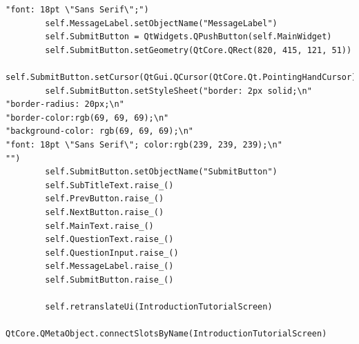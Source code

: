 \documentclass{article}
\begin{document}
\begin{lstlisting}
"font: 18pt \"Sans Serif\";")
        self.MessageLabel.setObjectName("MessageLabel")
        self.SubmitButton = QtWidgets.QPushButton(self.MainWidget)
        self.SubmitButton.setGeometry(QtCore.QRect(820, 415, 121, 51))
        self.SubmitButton.setCursor(QtGui.QCursor(QtCore.Qt.PointingHandCursor))
        self.SubmitButton.setStyleSheet("border: 2px solid;\n"
"border-radius: 20px;\n"
"border-color:rgb(69, 69, 69);\n"
"background-color: rgb(69, 69, 69);\n"
"font: 18pt \"Sans Serif\"; color:rgb(239, 239, 239);\n"
"")
        self.SubmitButton.setObjectName("SubmitButton")
        self.SubTitleText.raise_()
        self.PrevButton.raise_()
        self.NextButton.raise_()
        self.MainText.raise_()
        self.QuestionText.raise_()
        self.QuestionInput.raise_()
        self.MessageLabel.raise_()
        self.SubmitButton.raise_()

        self.retranslateUi(IntroductionTutorialScreen)
        QtCore.QMetaObject.connectSlotsByName(IntroductionTutorialScreen)


\end{lstlisting}
\end{document}
